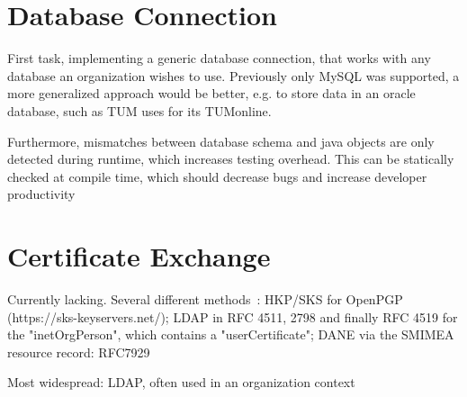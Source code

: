 \section{Database Connection}\label{sec:databaseConnection}
First task, implementing a generic database connection, that works with any database an organization wishes to use.
Previously only MySQL was supported, a more generalized approach would be better, e.g. to store data in an oracle
database, such as TUM uses for its TUMonline.

Furthermore, mismatches between database schema and java objects are only detected during runtime, which increases
testing overhead.
This can be statically checked at compile time, which should decrease bugs and increase developer productivity

\section{Certificate Exchange}\label{sec:certificateExchange}
Currently lacking.
Several different methods~\cite{haunerIdp}:
HKP/SKS for OpenPGP (https://sks-keyservers.net/);
LDAP in RFC 4511, 2798 and finally RFC 4519 for the "inetOrgPerson", which contains a "userCertificate";
DANE via the SMIMEA resource record: RFC7929

Most widespread: LDAP, often used in an organization context
